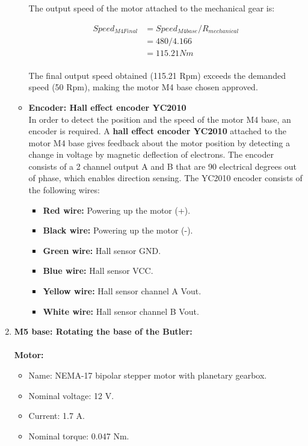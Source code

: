 \begin{enumerate}
\begin{itemize}
    The output speed of the motor attached to the mechanical gear is:
    
    \begin{equation} \label{eq: Speed_M4Final}
    \begin{split} 
    Speed_{M4Final} & = Speed_{M4base} / R_{mechanical}\\
    & =  480 / 4.166\\
    & = 115.21 Nm\\
    \end{split}
    \end{equation}
    
    The final output speed obtained (115.21 Rpm) exceeds the demanded speed (50 Rpm), making the motor M4 base chosen approved.\\
    
    \item \textbf{Encoder: Hall effect encoder YC2010}\\
    In order to detect the position and the speed of the motor M4 base, an encoder is required. A \textbf{hall effect encoder YC2010} attached to the motor M4 base gives feedback about the motor position by detecting a change in voltage by magnetic deflection of electrons. The encoder consists of a 2 channel output A and B that are 90 electrical degrees out of phase, which enables direction sensing. The YC2010 encoder consists of the following wires:
    \begin{itemize}
        \item \textbf{Red wire:} Powering up the motor (+).
        \item \textbf{Black wire:} Powering up the motor (-).
        \item \textbf{Green wire:} Hall sensor GND.
        \item \textbf{Blue wire:} Hall sensor VCC.
        \item \textbf{Yellow wire:} Hall sensor channel A Vout.
        \item \textbf{White wire:} Hall sensor channel B Vout.\\
    \end{itemize}
   
    
    \end{itemize}
    
    \item \textbf {M5 base: Rotating the base of the Butler:}\\\\
     \textbf{Motor:}
    \begin{itemize}
        \item Name: NEMA-17 bipolar stepper motor with planetary gearbox\cite{M2andM5}.
        \item Nominal voltage: 12 V.
        \item Current: 1.7 A.
        \item Nominal torque: 0.047 Nm.\\
    \end{itemize}
    

\end{enumerate}
